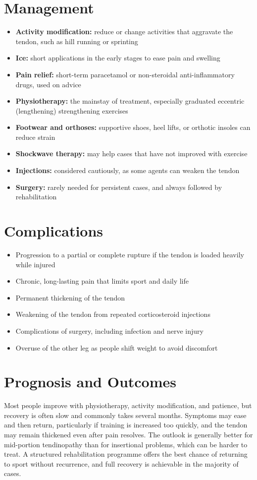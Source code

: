 \section*{Management}
\begin{itemize}
    \item \textbf{Activity modification:} reduce or change activities that aggravate the tendon, such as hill running or sprinting
    \item \textbf{Ice:} short applications in the early stages to ease pain and swelling
    \item \textbf{Pain relief:} short-term paracetamol or non-steroidal anti-inflammatory drugs, used on advice
    \item \textbf{Physiotherapy:} the mainstay of treatment, especially graduated eccentric (lengthening) strengthening exercises
    \item \textbf{Footwear and orthoses:} supportive shoes, heel lifts, or orthotic insoles can reduce strain
    \item \textbf{Shockwave therapy:} may help cases that have not improved with exercise
    \item \textbf{Injections:} considered cautiously, as some agents can weaken the tendon
    \item \textbf{Surgery:} rarely needed for persistent cases, and always followed by rehabilitation
\end{itemize}

\section*{Complications}
\begin{itemize}
    \item Progression to a partial or complete rupture if the tendon is loaded heavily while injured
    \item Chronic, long-lasting pain that limits sport and daily life
    \item Permanent thickening of the tendon
    \item Weakening of the tendon from repeated corticosteroid injections
    \item Complications of surgery, including infection and nerve injury
    \item Overuse of the other leg as people shift weight to avoid discomfort
\end{itemize}

\section*{Prognosis and Outcomes}
Most people improve with physiotherapy, activity modification, and patience, but recovery is often slow and commonly takes several months. Symptoms may ease and then return, particularly if training is increased too quickly, and the tendon may remain thickened even after pain resolves. The outlook is generally better for mid-portion tendinopathy than for insertional problems, which can be harder to treat. A structured rehabilitation programme offers the best chance of returning to sport without recurrence, and full recovery is achievable in the majority of cases.

